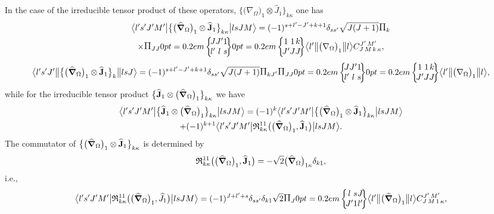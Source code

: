 In the case of the irreducible tensor product of these operators, \(\bigl\{\bigl(\nabla_{\Omega}\bigr)_{1} \otimes \widehat{J}_{1}\bigr\}_{k \kappa}\) one has
\begin{multline}
\braOket{ l^{\prime} s^{\prime} J^{\prime} M^{\prime}}{\bigl\{\bigl(\delop_{\Omega}\bigr)_{1} \otimes \widehat{\vect{J}}_{1}\bigr\}_{k \kappa}}{l s J M}=(-1)^{s+l^{\prime}-J^{\prime}+k+1} \delta_{s s^{\prime}} \sqrt{J(J+1)} \Fact{k} \\
 \times\Fact{J J}
\sixj{J}{J^{\prime}}{1}{l^{\prime}}{l}{s}
\sixj{1}{1}{k}{J^{\prime}}{J}{J}
\braOketred{ l^{\prime}}{\bigl(\nabla_{\Omega}\bigr)_{1}}{ l}
\clebsch{J}{M}{k}{\kappa}{J^{\prime}}{M^{\prime}}, \label{eq:13:2:61}
\end{multline}
\begin{multline*}
\braOketred{ l^{\prime} s^{\prime} J^{\prime}}{\bigl\{\bigl(\delop_{\Omega}\bigr)_{1} \otimes \widehat{\vect{J}}_{1}\bigr\}_{k}}{l s J}=(-1)^{s+l^{\prime}-J^{\prime}+k+1} \delta_{s s^{\prime}} \sqrt{J(J+1)} \Fact{k J^{\prime}}\Fact{J J} 
\sixj{J}{J^{\prime}}{1}{l^{\prime}}{l}{s}
\sixj{1}{1}{k}{J^{\prime}}{J}{J}
\braOketred{ l^{\prime}}{\bigl(\nabla_{\Omega}\bigr)_{1}}{ l} ,
\end{multline*}
while for the irreducible tensor product \(\bigl\{\widehat{\mathbf{J}}_{1} \otimes\bigl(\widehat{\boldsymbol{\nabla}}_{\Omega}\bigr)_{1}\bigr\}_{k \kappa}\) we have
\begin{multline}
\bigl\langle  l^{\prime} s^{\prime} J^{\prime} M^{\prime} \big| \bigl\{\widehat{\mathbf{J}}_{1} \otimes\bigl(\widehat{\boldsymbol{\nabla}}_{\Omega}\bigr)_{1}\bigr\}_{k \kappa} \big| l s J M \bigr\rangle=  (-1)^{k}
\bigl\langle l^{\prime} s^{\prime} J^{\prime} M^{\prime} \big| \bigl\{\bigl(\widehat{\boldsymbol{\nabla}}_{\Omega}\bigr)_{1} \otimes \widehat{\mathbf{J}}_{1}\bigr\}_{k \kappa} \big| l s J M \bigr\rangle \\
 +(-1)^{k+1}
\bigl\langle  l^{\prime} s^{\prime} J^{\prime} M^{\prime} \big|  \mathfrak{R}_{k \kappa}^{11}\bigl(\bigl(\widehat{\boldsymbol{\nabla}}_{\Omega}\bigr)_{1}, \widehat{\mathbf{J}}_{1}\bigr) \big| l s J M \bigr\rangle. \label{eq:13:2:62}
\end{multline}
The commutator of \(\bigl\{\bigl(\widehat{\boldsymbol{\nabla}}_{\Omega}\bigr)_{1} \otimes \widehat{\mathbf{J}}_{1}\bigr\}_{k \kappa}\) is determined by
\begin{equation}
\mathfrak{R}_{k \kappa}^{11}\bigl(\bigl(\widehat{\boldsymbol{\nabla}}_{\Omega}\bigr)_{1}, \widehat{\mathbf{J}}_{1}\bigr)=-\sqrt{2}\bigl(\widehat{\boldsymbol{\nabla}}_{\Omega}\bigr)_{1 \kappa} \delta_{k 1}, \label{eq:13:2:63}
\end{equation}
i.e.,
\begin{equation}
\braOket{ l^{\prime} s^{\prime} J^{\prime} M^{\prime}}{ \mathfrak{R}_{k \kappa}^{11}\bigl(\bigl(\delop_{\Omega}\bigr)_{1}, \widehat{J}_{1}\bigr)}{l s J M}=(-1)^{J+l^{\prime}+s} \delta_{s s^{\prime}} \delta_{k 1} \sqrt{2}\Fact{J}
\sixj{l}{s}{J}{J^{\prime}}{1}{l^{\prime}}
\braOketred{ l^{\prime}}{\bigl(\delop_{\Omega}\bigr)_{1}}{ l} 
\clebsch{J}{M}{1}{\kappa}{J^{\prime}}{M^{\prime}}, \label{eq:13:2:64}
\end{equation}
